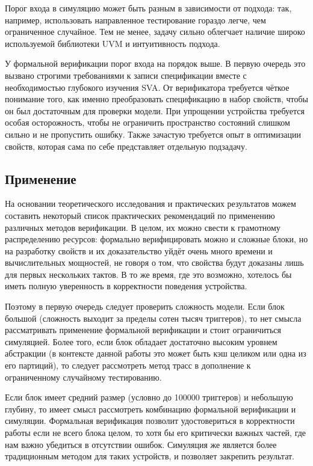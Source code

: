 \tab Порог входа в симуляцию может быть разным в зависимости от подхода: так, например, использовать направленное тестирование гораздо легче, чем ограниченное случайное. Тем не менее, задачу сильно облегчает наличие широко используемой библиотеки UVM и интуитивность подхода.

У формальной верификации порог входа на порядок выше. В первую очередь это вызвано строгими требованиями к записи спецификации вместе с необходимостью глубокого изучения SVA. От верификатора требуется чёткое понимание того, как именно преобразовать спецификацию в набор свойств, чтобы он был достаточным для проверки модели. При упрощении устройства требуется особая осторожность, чтобы не ограничить пространство состояний слишком сильно и не пропустить ошибку. Также зачастую требуется опыт в оптимизации свойств, которая сама по себе представляет отдельную подзадачу. 

\subsection{Применение}

\tab На основании теоретического исследования и практических результатов можем составить некоторый список практических рекомендаций по применению различных методов верификации. В целом, их можно свести к грамотному распределению ресурсов: формально верифицировать можно и сложные блоки, но на разработку свойств и их доказательство уйдёт очень много времени и вычислительных мощностей, не говоря о том, что свойства будут доказаны лишь для первых нескольких тактов. В то же время, где это возможно, хотелось бы иметь полную уверенность в корректности поведения устройства. 

Поэтому в первую очередь следует проверить сложность модели. Если блок большой (сложность выходит за пределы сотен тысяч триггеров), то нет смысла рассматривать применение формальной верификации и стоит ограничиться симуляцией. Более того, если блок обладает достаточно высоким уровнем абстракции (в контексте данной работы это может быть кэш целиком или одна из его партиций), то следует рассмотреть метод трасс в дополнение к ограниченному случайному тестированию. 

Если блок имеет средний размер (условно до 100000 триггеров) и небольшую глубину, то имеет смысл рассмотреть комбинацию формальной верификации и симуляции. Формальная верификация позволит удостовериться в корректности работы если не всего блока целом, то хотя бы его критически важных частей, где нам важно убедиться в отсутствии ошибок. Симуляция же является более традиционным методом для таких устройств, и позволяет закрепить результат. 

